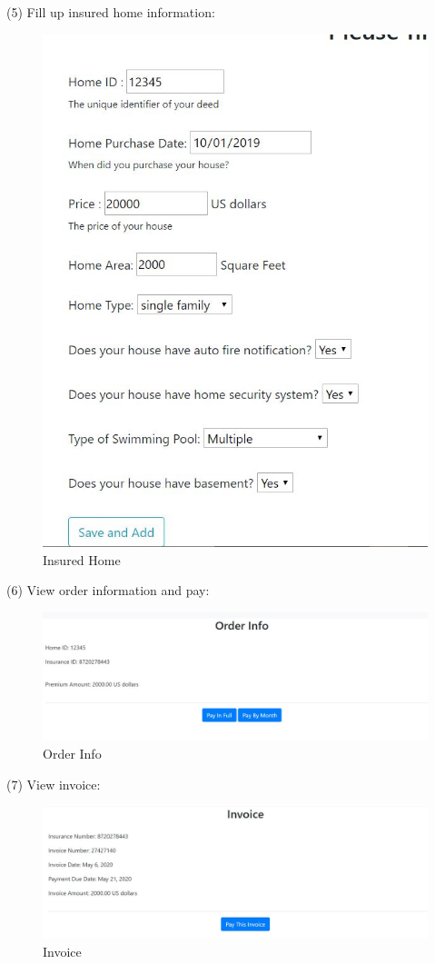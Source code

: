 \documentclass[12pt]{article}
\begin{document}
	\noindent (5) Fill up insured home information:
	\begin{figure}[H]
		\centering
		\includegraphics[scale=0.58]{insuredhome}
		\caption{Insured Home}
	\end{figure}
	\noindent(6) View order information and pay:
	\begin{figure}[H]
		\centering
		\includegraphics[scale=0.52]{orderinfo}
		\caption{Order Info}
	\end{figure}
	\noindent (7) View invoice:
	\begin{figure}[H]
		\centering
		\includegraphics[scale=0.52]{invoice}
		\caption{Invoice}
	\end{figure}
\end{document}
